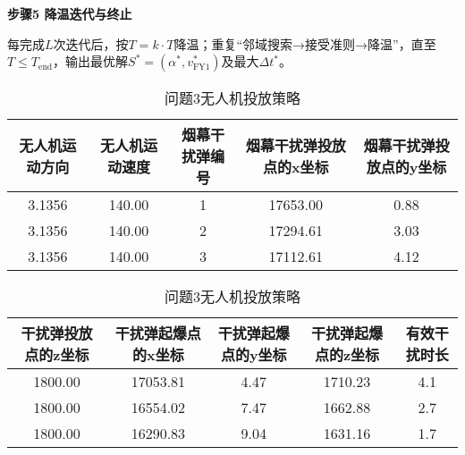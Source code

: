 \documentclass[../main.tex]{subfiles}
\begin{document}
\noindent\textbf{步骤5 降温迭代与终止}

每完成$L$次迭代后，按$T = k \cdot T$降温；重复“邻域搜索→接受准则→降温”，直至$T \leq T_{\text{end}}$，输出最优解$S^*=(\alpha^*, v_{\text{FY1}}^*)$及最大$\Delta t^*$。

\begin{table}[H]
\caption{问题3无人机投放策略}
\label{tab:001} 
\centering
\begin{small}
\begin{tabular}{ccccc}
\toprule[1.5pt]
无人机运动方向 & 无人机运动速度 & 烟幕干扰弹编号 & 烟幕干扰弹投放点的x坐标& 烟幕干扰弹投放点的y坐标 \\
\midrule[1pt]
  3.1356           &140.00                  & 1     & 17653.00                   & 0.88     \\            
  3.1356           &140.00                  & 2     & 17294.61                   & 3.03      \\           
  3.1356           &140.00                  & 3     & 17112.61                   & 4.12      \\           
\bottomrule[1.5pt]
\end{tabular}
\end{small}
\end{table}

\begin{table}[H]
\caption{问题3无人机投放策略}
\label{tab:031} 
\centering
\begin{small}
\begin{tabular}{ccccc}
\toprule[1.5pt]
    干扰弹投放点的z坐标 &干扰弹起爆点的x坐标&干扰弹起爆点的y坐标&干扰弹起爆点的z坐标&有效干扰时长\\
\midrule[1pt]
1800.00             &17053.81                   & 4.47    &1710.23        & 4.1  \\               
1800.00             &16554.02                   & 7.47    & 1662.88       & 2.7  \\               
1800.00             &16290.83                   & 9.04    & 1631.16       & 1.7  \\                
\bottomrule[1.5pt]
\end{tabular}
\end{small}
\end{table}
\end{document}
